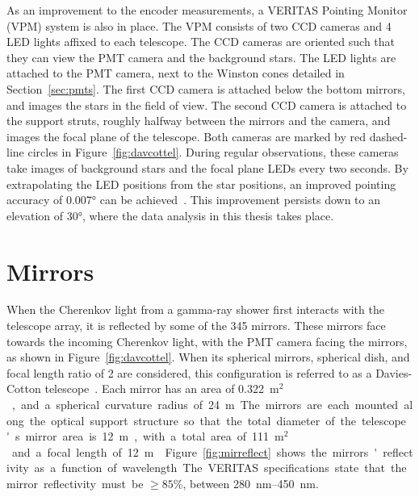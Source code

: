 As an improvement to the encoder measurements, a VERITAS Pointing Monitor (VPM) system is also in place.
The VPM consists of two CCD cameras and 4 LED lights affixed to each telescope.
The CCD cameras are oriented such that they can view the PMT camera and the background stars.
The LED lights are attached to the PMT camera, next to the Winston cones detailed in Section~\ref{sec:pmts}.
The first CCD camera is attached below the bottom mirrors, and images the stars in the field of view.
The second CCD camera is attached to the support struts, roughly halfway between the mirrors and the camera, and images the focal plane of the telescope.
Both cameras are marked by red dashed-line circles in Figure~\ref{fig:davcottel}.
During regular observations, these cameras take images of background stars and the focal plane LEDs every two seconds.
By extrapolating the LED positions from the star positions, an improved pointing accuracy of \nicetilde{}\ang{0.007} can be achieved~\cite{VPMmemo}.
%
This improvement persists down to an elevation of \ang{30}, where the data analysis in this thesis takes place.

\section{Mirrors}\label{sec:mirrors}

When the Cherenkov light from a gamma-ray shower first interacts with the telescope array, it is reflected by some of the 345 mirrors.
These mirrors face towards the incoming Cherenkov light, with the PMT camera facing the mirrors, as shown in Figure~\ref{fig:davcottel}.
When its spherical mirrors, spherical dish, and focal length ratio of \nicetilde{}2 are considered, this configuration is referred to as a Davies-Cotton telescope~\cite{daviescotton}.
Each mirror has an area of \SI{0.322}{m$^2$}, and a spherical curvature radius of \SI{24}{m}.
The mirrors are each mounted along the optical support structure so that the total diameter of the telescope's mirror area is \SI{12}{m}, with a total area of \SI{111}{m$^2$} and a focal length of \SI{12}{m}~\cite{Veritas_Detector}.
Figure~\ref{fig:mirreflect} shows the mirrors' reflectivity as a function of wavelength.
The VERITAS specifications state that the mirror reflectivity must be $\geq 85\%$, between \SIrange{280}{450}{nm}.

